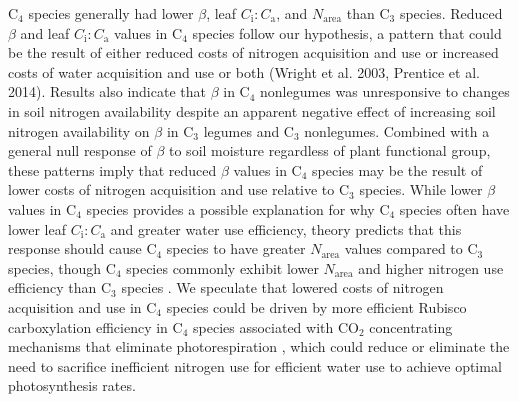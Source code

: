 C$_4$ species generally had lower $\beta$, leaf $C_\mathrm{i}\mathrm{:}C_\mathrm{a}$, and $N_\mathrm{area}$ than C$_3$ species. Reduced $\beta$ and leaf $C_\mathrm{i}\mathrm{:}C_\mathrm{a}$ values in C$_4$ species follow our hypothesis, a pattern that could be the result of either reduced costs of nitrogen acquisition and use or increased costs of water acquisition and use or both (Wright et al. 2003, Prentice et al. 2014). Results also indicate that $\beta$ in C$_4$ nonlegumes was unresponsive to changes in soil nitrogen availability despite an apparent negative effect of increasing soil nitrogen availability on $\beta$ in C$_3$ legumes and C$_3$ nonlegumes. Combined with a general null response of $\beta$ to soil moisture regardless of plant functional group, these patterns imply that reduced $\beta$ values in C$_4$ species may be the result of lower costs of nitrogen acquisition and use relative to C$_3$ species. While lower $\beta$ values in C$_4$ species provides a possible explanation for why C$_4$ species often have lower leaf $C_\mathrm{i}\mathrm{:}C_\mathrm{a}$ and greater water use efficiency, theory predicts that this response should cause C$_4$ species to have greater $N_\mathrm{area}$ values compared to C$_3$ species, though C$_4$ species commonly exhibit lower $N_\mathrm{area}$ and higher nitrogen use efficiency than C$_3$ species . We speculate that lowered costs of nitrogen acquisition and use in C$_4$ species could be driven by more efficient Rubisco carboxylation efficiency in C$_4$ species associated with CO$_2$ concentrating mechanisms that eliminate photorespiration , which could reduce or eliminate the need to sacrifice inefficient nitrogen use for efficient water use to achieve optimal photosynthesis rates.

